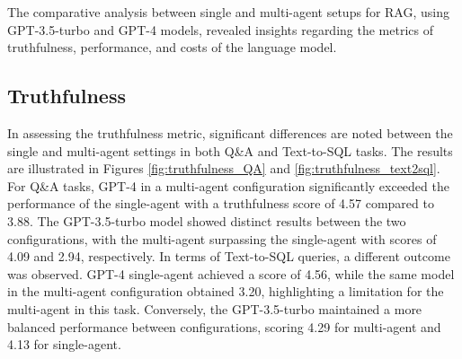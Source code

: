         The comparative analysis between single and multi-agent setups for RAG, using GPT-3.5-turbo and GPT-4 models, revealed insights regarding the metrics of truthfulness, performance, and costs of the language model.

        
        \subsection{Truthfulness} 
            In assessing the truthfulness metric, significant differences are noted between the single and multi-agent settings in both Q\&A and Text-to-SQL tasks. The results are illustrated in Figures \ref{fig:truthfulness_QA} and \ref{fig:truthfulness_text2sql}.
            For Q\&A tasks, GPT-4 in a multi-agent configuration significantly exceeded the performance of the single-agent with a truthfulness score of 4.57 compared to 3.88. The GPT-3.5-turbo model showed distinct results between the two configurations, with the multi-agent surpassing the single-agent with scores of 4.09 and 2.94, respectively.
            In terms of Text-to-SQL queries, a different outcome was observed. GPT-4 single-agent achieved a score of 4.56, while the same model in the multi-agent configuration obtained 3.20, highlighting a limitation for the multi-agent in this task. Conversely, the GPT-3.5-turbo maintained a more balanced performance between configurations, scoring 4.29 for multi-agent and 4.13 for single-agent.
            
            
            
